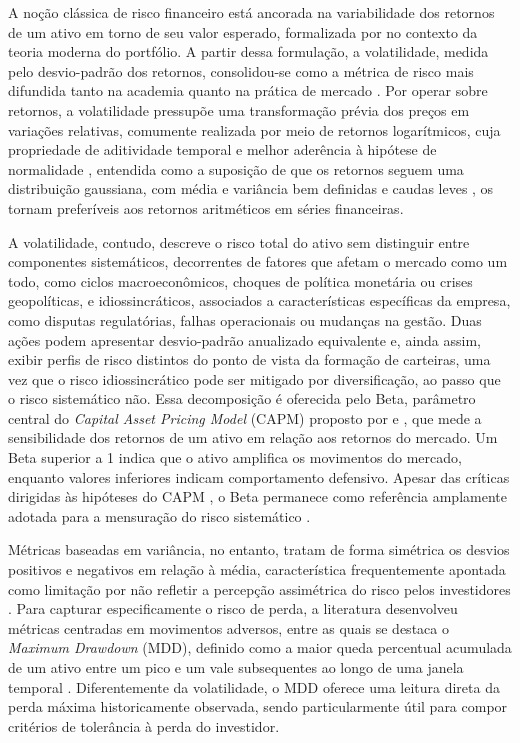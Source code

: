 A noção clássica de risco financeiro está ancorada na variabilidade dos retornos de um ativo em torno de seu valor esperado, formalizada por  no contexto da teoria moderna do portfólio. A partir dessa formulação, a volatilidade, medida pelo desvio-padrão dos retornos, consolidou-se como a métrica de risco mais difundida tanto na academia quanto na prática de mercado \cite{assaf_neto_mercado_2022}. Por operar sobre retornos, a volatilidade pressupõe uma transformação prévia dos preços em variações relativas, comumente realizada por meio de retornos logarítmicos, cuja propriedade de aditividade temporal e melhor aderência à hipótese de normalidade \cite{campbell_econometrics_1997}, entendida como a suposição de que os retornos seguem uma distribuição gaussiana, com média e variância bem definidas e caudas leves \cite{assaf_neto_mercado_2022}, os tornam preferíveis aos retornos aritméticos em séries financeiras. 

A volatilidade, contudo, descreve o risco total do ativo sem distinguir entre componentes sistemáticos, decorrentes de fatores que afetam o mercado como um todo, como ciclos macroeconômicos, choques de política monetária ou crises geopolíticas, e idiossincráticos, associados a características específicas da empresa, como disputas regulatórias, falhas operacionais ou mudanças na gestão. Duas ações podem apresentar desvio-padrão anualizado equivalente e, ainda assim, exibir perfis de risco distintos do ponto de vista da formação de carteiras, uma vez que o risco idiossincrático pode ser mitigado por diversificação, ao passo que o risco sistemático não. Essa decomposição é oferecida pelo Beta, parâmetro central do \textit{Capital Asset Pricing Model} (CAPM) proposto por  e , que mede a sensibilidade dos retornos de um ativo em relação aos retornos do mercado. Um Beta superior a 1 indica que o ativo amplifica os movimentos do mercado, enquanto valores inferiores indicam comportamento defensivo. Apesar das críticas dirigidas às hipóteses do CAPM \cite{Fama1992CrossSection}, o Beta permanece como referência amplamente adotada para a mensuração do risco sistemático \cite{assaf_neto_mercado_2022}.

Métricas baseadas em variância, no entanto, tratam de forma simétrica os desvios positivos e negativos em relação à média, característica frequentemente apontada como limitação por não refletir a percepção assimétrica do risco pelos investidores \cite{kahneman_prospect_1979, pompian_behavioral_2012}. Para capturar especificamente o risco de perda, a literatura desenvolveu métricas centradas em movimentos adversos, entre as quais se destaca o \textit{Maximum Drawdown} (MDD), definido como a maior queda percentual acumulada de um ativo entre um pico e um vale subsequentes ao longo de uma janela temporal \cite{chekhlov_drawdown_2005, assaf_neto_mercado_2022}. Diferentemente da volatilidade, o MDD oferece uma leitura direta da perda máxima historicamente observada, sendo particularmente útil para compor critérios de tolerância à perda do investidor.

